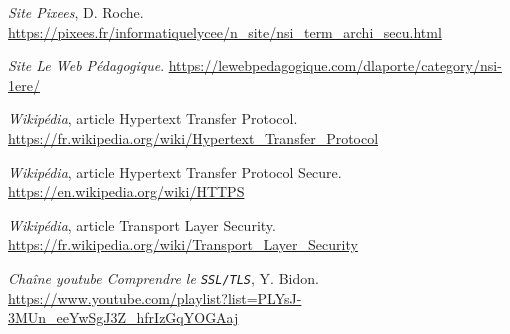 \documentclass[a4paper,11pt]{article}
\begin{document}
\begin{thebibliography}{00}

  {\em Site Pixees}, D. Roche.
  \url{https://pixees.fr/informatiquelycee/n_site/nsi_term_archi_secu.html}




  {\em Site Le Web Pédagogique}.
  \url{https://lewebpedagogique.com/dlaporte/category/nsi-1ere/}

  {\em Wikipédia}, article \og Hypertext Transfer Protocol\fg.
  \url{https://fr.wikipedia.org/wiki/Hypertext_Transfer_Protocol}

  {\em Wikipédia}, article \og Hypertext Transfer Protocol Secure\fg.
  \url{https://en.wikipedia.org/wiki/HTTPS}
  
  {\em Wikipédia}, article \og Transport Layer Security\fg.
  \url{https://fr.wikipedia.org/wiki/Transport_Layer_Security}
  
  {\em Chaîne youtube Comprendre le {\tt SSL/TLS}}, Y. Bidon.
  \url{https://www.youtube.com/playlist?list=PLYsJ-3MUn_eeYwSgJ3Z_hfrIzGqYOGAaj}

\end{thebibliography}

\end{document}
